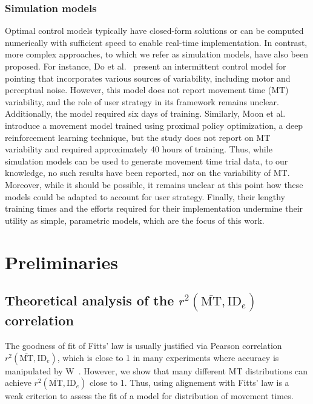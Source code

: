 \documentclass[acmlarge, manuscript,review]{acmart}
\newcommand{\mmt}{\ensuremath{\overline{\mt}}\xspace}
\newcommand{\mt}{\ensuremath{{\text{MT}}}\xspace}
\newcommand{\ide}{\ensuremath{{\text{ID}_e}}\xspace}
\begin{document}
\subsubsection{Simulation models}
Optimal control models typically have closed-form solutions or can be computed numerically with sufficient speed to enable real-time implementation. In contrast, more complex approaches, to which we refer as simulation models, have also been proposed. For instance, Do et al.~\cite{do2021} present an intermittent control model for pointing that incorporates various sources of variability, including motor and perceptual noise. However, this model does not report movement time (MT) variability, and the role of user strategy in its framework remains unclear. Additionally, the model required six days of training.
Similarly, Moon et al.~\cite{moon2024} introduce a movement model trained using proximal policy optimization, a deep reinforcement learning technique, but the study does not report on MT variability and required approximately 40 hours of training.
Thus, while simulation models can be used to generate movement time trial data, to our knowledge, no such results have been reported, nor on the variability of MT. Moreover, while it should be possible, it remains unclear at this point how these models could be adapted to account for user strategy. Finally, their lengthy training times and the efforts required for their implementation undermine their utility as simple, parametric models, which are the focus of this work.





\section{Preliminaries}

\subsection{Theoretical analysis of the $r^2(\mmt, \ide)$ correlation \label{subs:theory_rsq}}


The goodness of fit of Fitts' law is usually justified via Pearson correlation $r^2(\mmt, \ide)$, which is close to 1 in many experiments where accuracy is manipulated by W~\cite{soukoreff2004}.
However, we show that many different MT distributions can achieve $r^2(\mmt, \ide)$ close to 1. Thus, using alignement with Fitts' law is a weak criterion to assess the fit of a model for distribution of movement times.
\end{document}
